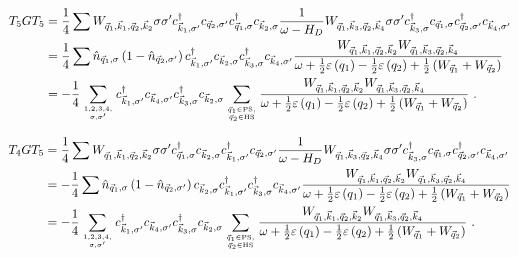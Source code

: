 \documentclass{revtex4-2}
\begin{document}
\begin{equation}\begin{aligned}
	T_5 G T_5 &= \frac{1}{4}\sum  W_{\vec q_1,\vec k_1, \vec q_2, \vec k_2} \sigma\sigma^\prime c^\dagger_{\vec k_1,\sigma^\prime}c_{\vec q_2,\sigma^\prime}c^\dagger_{\vec q_1,\sigma}c_{\vec k_2,\sigma} \frac{1}{\omega - H_D}W_{\vec q_1, \vec k_3, \vec q_2, \vec k_4} \sigma\sigma^\prime c^\dagger_{\vec k_3,\sigma}c_{\vec q_1,\sigma}c^\dagger_{\vec q_2,\sigma^\prime}c_{\vec k_4,\sigma^\prime}\\
		  &= \frac{1}{4}\sum \hat n_{\vec q_1,\sigma} \left(1 - \hat n_{\vec q_2,\sigma^\prime}\right) c^\dagger_{\vec k_1,\sigma^\prime}c_{\vec k_2,\sigma}c^\dagger_{\vec k_3,\sigma}c_{\vec k_4,\sigma^\prime} \frac{W_{\vec q_1,\vec k_1, \vec q_2, \vec k_2} W_{\vec q_1, \vec k_3, \vec q_2, \vec k_4}}{\omega + \frac{1}{2}\varepsilon\left(q_1\right) - \frac{1}{2}\varepsilon\left(q_2\right) + \frac{1}{2}\left(W_{\vec q_1} + W_{\vec q_2}\right)}  \\
		  &= -\frac{1}{4}\sum_{1,2,3,4,\atop{\sigma,\sigma^\prime}} c^\dagger_{\vec k_1,\sigma^\prime} c_{\vec k_4,\sigma^\prime} c^\dagger_{\vec k_3,\sigma} c_{\vec k_2,\sigma} \sum_{\vec q_1 \in \text{PS}, \atop{\vec q_2 \in \text{HS}}}\frac{W_{\vec q_1,\vec k_1, \vec q_2, \vec k_2} W_{\vec q_1, \vec k_3, \vec q_2, \vec k_4}}{\omega + \frac{1}{2}\varepsilon\left(q_1\right) - \frac{1}{2}\varepsilon\left(q_2\right) + \frac{1}{2}\left(W_{\vec q_1} + W_{\vec q_2}\right)}~.
\end{aligned}\end{equation}

\begin{equation}\begin{aligned}
	T_4 G T_5 &= \frac{1}{4}\sum  W_{\vec q_1,\vec k_1, \vec q_2, \vec k_2} \sigma\sigma^\prime c^\dagger_{\vec q_1,\sigma}c_{\vec k_2,\sigma}c^\dagger_{\vec k_1,\sigma^\prime}c_{\vec q_2,\sigma^\prime} \frac{1}{\omega - H_D}W_{\vec q_1, \vec k_3, \vec q_2, \vec k_4} \sigma\sigma^\prime c^\dagger_{\vec k_3,\sigma}c_{\vec q_1,\sigma}c^\dagger_{\vec q_2,\sigma^\prime}c_{\vec k_4,\sigma^\prime}\\
		  &= -\frac{1}{4}\sum \hat n_{\vec q_1,\sigma} \left(1 - \hat n_{\vec q_2,\sigma^\prime}\right) c_{\vec k_2,\sigma} c^\dagger_{\vec k_1,\sigma^\prime}c^\dagger_{\vec k_3,\sigma}c_{\vec k_4,\sigma^\prime} \frac{W_{\vec q_1,\vec k_1, \vec q_2, \vec k_2} W_{\vec q_1, \vec k_3, \vec q_2, \vec k_4}}{\omega + \frac{1}{2}\varepsilon\left(q_1\right) - \frac{1}{2}\varepsilon\left(q_2\right) + \frac{1}{2}\left(W_{\vec q_1} + W_{\vec q_2}\right)}  \\
		  &= -\frac{1}{4}\sum_{1,2,3,4,\atop{\sigma,\sigma^\prime}} c^\dagger_{\vec k_1,\sigma^\prime}c_{\vec k_4,\sigma^\prime}c^\dagger_{\vec k_3,\sigma} c_{\vec k_2,\sigma} \sum_{\vec q_1 \in \text{PS}, \atop{\vec q_2 \in \text{HS}}}\frac{W_{\vec q_1,\vec k_1, \vec q_2, \vec k_2} W_{\vec q_1, \vec k_3, \vec q_2, \vec k_4}}{\omega + \frac{1}{2}\varepsilon\left(q_1\right) - \frac{1}{2}\varepsilon\left(q_2\right) + \frac{1}{2}\left(W_{\vec q_1} + W_{\vec q_2}\right)}~.
\end{aligned}\end{equation}
\end{document}

